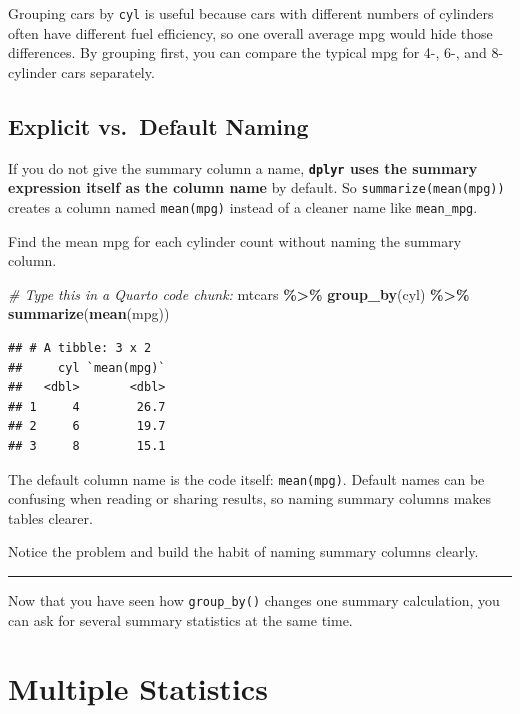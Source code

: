 \documentclass[
]{article}
\newenvironment{Shaded}{\begin{snugshade}}{\end{snugshade}}
\newcommand{\CommentTok}[1]{\textcolor[rgb]{0.56,0.35,0.01}{\textit{#1}}}
\newcommand{\FunctionTok}[1]{\textcolor[rgb]{0.13,0.29,0.53}{\textbf{#1}}}
\newcommand{\NormalTok}[1]{#1}
\newcommand{\SpecialCharTok}[1]{\textcolor[rgb]{0.81,0.36,0.00}{\textbf{#1}}}
\begin{document}
Grouping cars by \texttt{cyl} is useful because cars with different
numbers of cylinders often have different fuel efficiency, so one
overall average mpg would hide those differences. By grouping first, you
can compare the typical mpg for 4-, 6-, and 8-cylinder cars separately.

\subsection{Explicit vs.~Default
Naming}\label{explicit-vs.-default-naming}

If you do not give the summary column a name, \textbf{\texttt{dplyr}
uses the summary expression itself as the column name} by default. So
\texttt{summarize(mean(mpg))} creates a column named \texttt{mean(mpg)}
instead of a cleaner name like \texttt{mean\_mpg}.

Find the mean mpg for each cylinder count without naming the summary
column.

\begin{Shaded}
\begin{Highlighting}[]
\CommentTok{\#  Type this in a Quarto code chunk:}
\NormalTok{mtcars }\SpecialCharTok{\%\textgreater{}\%}
  \FunctionTok{group\_by}\NormalTok{(cyl) }\SpecialCharTok{\%\textgreater{}\%}
  \FunctionTok{summarize}\NormalTok{(}\FunctionTok{mean}\NormalTok{(mpg))      }
\end{Highlighting}
\end{Shaded}

\begin{verbatim}
## # A tibble: 3 x 2
##     cyl `mean(mpg)`
##   <dbl>       <dbl>
## 1     4        26.7
## 2     6        19.7
## 3     8        15.1
\end{verbatim}

The default column name is the code itself: \texttt{mean(mpg)}. Default
names can be confusing when reading or sharing results, so naming
summary columns makes tables clearer.

Notice the problem and build the habit of naming summary columns
clearly.

\begin{center}\rule{0.5\linewidth}{0.5pt}\end{center}

Now that you have seen how \texttt{group\_by()} changes one summary
calculation, you can ask for several summary statistics at the same
time.

\section{Multiple Statistics}\label{multiple-stats}
\end{document}
